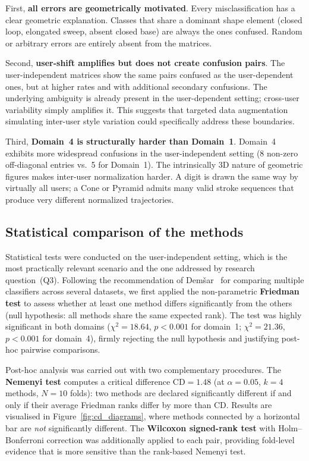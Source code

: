 First, \textbf{all errors are geometrically motivated}. Every misclassification has a clear geometric explanation. Classes that share a dominant shape element (closed loop, elongated sweep, absent closed base) are always the ones confused. Random or arbitrary errors are entirely absent from the matrices.

Second, \textbf{user-shift amplifies but does not create confusion pairs}. The user-independent matrices show the same pairs confused as the user-dependent ones, but at higher rates and with additional secondary confusions. The underlying ambiguity is already present in the user-dependent setting; cross-user variability simply amplifies it. This suggests that targeted data augmentation simulating inter-user style variation could specifically address these boundaries.

Third, \textbf{Domain~4 is structurally harder than Domain~1}. Domain~4 exhibits more widespread confusions in the user-independent setting (8 non-zero off-diagonal entries vs.\ 5 for Domain~1). The intrinsically 3D nature of geometric figures makes inter-user normalization harder. A digit is drawn the same way by virtually all users; a Cone or Pyramid admits many valid stroke sequences that produce very different normalized trajectories.

\subsection{Statistical comparison of the methods}
\label{subsec:stats}

 
Statistical tests were conducted on the user-independent setting, which is
the most practically relevant scenario and the one addressed by research
question~(Q3). Following the recommendation of Dem\v{s}ar~\cite{Demsar2006}
for comparing multiple classifiers across several datasets, we first applied
the non-parametric \textbf{Friedman test} to assess whether at least one
method differs significantly from the others (null hypothesis: all methods
share the same expected rank). The test was highly significant in both domains
($\chi^2 = 18.64$, $p < 0.001$ for domain~1; $\chi^2 = 21.36$, $p < 0.001$
for domain~4), firmly rejecting the null hypothesis and justifying post-hoc
pairwise comparisons.
 
Post-hoc analysis was carried out with two complementary procedures.
The \textbf{Nemenyi test} computes a critical difference
$\mathrm{CD} = 1.48$ (at $\alpha = 0.05$, $k = 4$ methods, $N = 10$ folds):
two methods are declared significantly different if and only if their average
Friedman ranks differ by more than CD. Results are visualised in
Figure~\ref{fig:cd_diagrams}, where methods connected by a horizontal bar are
\emph{not} significantly different. The \textbf{Wilcoxon signed-rank test}
with Holm--Bonferroni correction was additionally applied to each pair,
providing fold-level evidence that is more sensitive than the rank-based
Nemenyi test.
 
